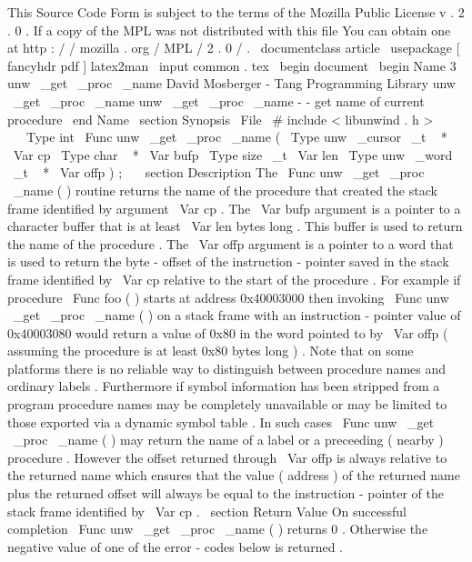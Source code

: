 %
This
Source
Code
Form
is
subject
to
the
terms
of
the
Mozilla
Public
%
License
v
.
2
.
0
.
If
a
copy
of
the
MPL
was
not
distributed
with
this
%
file
You
can
obtain
one
at
http
:
/
/
mozilla
.
org
/
MPL
/
2
.
0
/
.
\
documentclass
{
article
}
\
usepackage
[
fancyhdr
pdf
]
{
latex2man
}
\
input
{
common
.
tex
}
\
begin
{
document
}
\
begin
{
Name
}
{
3
}
{
unw
\
_get
\
_proc
\
_name
}
{
David
Mosberger
-
Tang
}
{
Programming
Library
}
{
unw
\
_get
\
_proc
\
_name
}
unw
\
_get
\
_proc
\
_name
-
-
get
name
of
current
procedure
\
end
{
Name
}
\
section
{
Synopsis
}
\
File
{
\
#
include
<
libunwind
.
h
>
}
\
\
\
Type
{
int
}
\
Func
{
unw
\
_get
\
_proc
\
_name
}
(
\
Type
{
unw
\
_cursor
\
_t
~
*
}
\
Var
{
cp
}
\
Type
{
char
~
*
}
\
Var
{
bufp
}
\
Type
{
size
\
_t
}
\
Var
{
len
}
\
Type
{
unw
\
_word
\
_t
~
*
}
\
Var
{
offp
}
)
;
\
\
\
section
{
Description
}
The
\
Func
{
unw
\
_get
\
_proc
\
_name
}
(
)
routine
returns
the
name
of
the
procedure
that
created
the
stack
frame
identified
by
argument
\
Var
{
cp
}
.
The
\
Var
{
bufp
}
argument
is
a
pointer
to
a
character
buffer
that
is
at
least
\
Var
{
len
}
bytes
long
.
This
buffer
is
used
to
return
the
name
of
the
procedure
.
The
\
Var
{
offp
}
argument
is
a
pointer
to
a
word
that
is
used
to
return
the
byte
-
offset
of
the
instruction
-
pointer
saved
in
the
stack
frame
identified
by
\
Var
{
cp
}
relative
to
the
start
of
the
procedure
.
For
example
if
procedure
\
Func
{
foo
}
(
)
starts
at
address
0x40003000
then
invoking
\
Func
{
unw
\
_get
\
_proc
\
_name
}
(
)
on
a
stack
frame
with
an
instruction
-
pointer
value
of
0x40003080
would
return
a
value
of
0x80
in
the
word
pointed
to
by
\
Var
{
offp
}
(
assuming
the
procedure
is
at
least
0x80
bytes
long
)
.
Note
that
on
some
platforms
there
is
no
reliable
way
to
distinguish
between
procedure
names
and
ordinary
labels
.
Furthermore
if
symbol
information
has
been
stripped
from
a
program
procedure
names
may
be
completely
unavailable
or
may
be
limited
to
those
exported
via
a
dynamic
symbol
table
.
In
such
cases
\
Func
{
unw
\
_get
\
_proc
\
_name
}
(
)
may
return
the
name
of
a
label
or
a
preceeding
(
nearby
)
procedure
.
However
the
offset
returned
through
\
Var
{
offp
}
is
always
relative
to
the
returned
name
which
ensures
that
the
value
(
address
)
of
the
returned
name
plus
the
returned
offset
will
always
be
equal
to
the
instruction
-
pointer
of
the
stack
frame
identified
by
\
Var
{
cp
}
.
\
section
{
Return
Value
}
On
successful
completion
\
Func
{
unw
\
_get
\
_proc
\
_name
}
(
)
returns
0
.
Otherwise
the
negative
value
of
one
of
the
error
-
codes
below
is
returned
.
